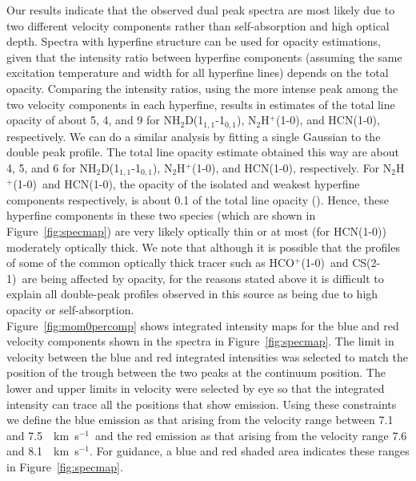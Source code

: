 \documentclass[iop]{emulateapj}
\newcommand{\kms}{\,~km~s$^{-1}$}
\newcommand{\nhtd}{\mbox{\rm NH$_2$D(1$_{1,1}$-1$_{0,1}$)}}
\newcommand{\nthp}{\mbox{\rm N$_2$H$^+$(1-0)}}
\newcommand{\hcn}{\mbox{\rm HCN(1-0)}}
\newcommand{\hcop}{\mbox{\rm  HCO$^+$(1-0)}}
\newcommand{\cs}{\mbox{\rm CS(2-1)}}
\newcommand{\htcop}{\mbox{\rm H$^{13}$CO$^{+}$(1-0)}}
\begin{document}
Our results indicate that the observed dual peak spectra are most likely due to two different velocity components rather than self-absorption and high optical depth.  Spectra with hyperfine structure can be used for opacity estimations, given that the intensity ratio between hyperfine components (assuming the same excitation temperature and width for all hyperfine lines) depends on the total opacity. Comparing the intensity ratios, using the more intense peak among the two velocity components in each hyperfine, results in estimates of the total line opacity of about 5, 4, and 9 for \nhtd, \nthp, and \hcn, respectively. We can do a similar analysis by fitting a single Gaussian to the double peak profile. The total line opacity estimate obtained this way are about 4, 5, and 6 for \nhtd, \nthp, and \hcn, respectively. For \nthp\ and \hcn, the opacity of the isolated and weakest hyperfine components respectively, is about 0.1 of the total line opacity (\citealt{2002AhrensSubdoppler,2009PaganiFrequency}). Hence, these hyperfine components in these two species (which are shown in Figure~\ref{fig:specmap}) are very likely optically thin or at most (for \hcn) moderately optically thick. We note that although it is possible that the profiles of some of the common optically thick tracer such as \hcop\ and \cs\ are being affected by opacity,  for the reasons stated above it is difficult to explain all double-peak profiles observed in this source as being due to high opacity or self-absorption.\\  %





Figure~\ref{fig:mom0percomp} shows integrated intensity maps for the blue and red velocity components shown in the spectra in Figure~\ref{fig:specmap}. The limit in velocity between the blue and red integrated intensities was selected to match the position of the trough between the two peaks at the continuum position. The lower and upper limits in velocity were selected by eye so that the integrated intensity can trace all the positions that show
emission. Using these constraints we define the blue emission as that arising from the velocity range between 7.1 and 7.5 \kms\ and the red emission as that arising from the velocity range 7.6 and 8.1 \kms. For guidance, a blue and red shaded area indicates these ranges in Figure~\ref{fig:specmap}.
\end{document}
